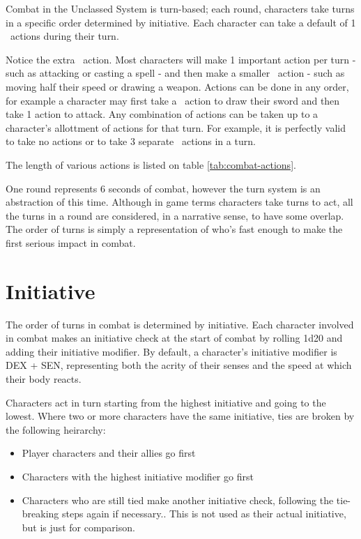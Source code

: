 \begin{multicols*}{2}
    Combat in the Unclassed System is turn-based; each round, characters take
    turns in a specific order determined by initiative. Each character can
    take a default of 1 \textonehalf\ actions during their turn.

    Notice the extra \textonehalf\ action. Most characters will make 1 important
    action per turn - such as attacking or casting a spell - and then make a
    smaller \textonehalf\ action - such as moving half their speed or drawing a
    weapon. Actions can be done in any order, for example a character may first
    take a \textonehalf\ action to draw their sword and then take 1 action to
    attack. Any combination of actions can be taken up to a character's
    allottment of actions for that turn. For example, it is perfectly valid
    to take no actions or to take 3 separate \textonehalf\ actions in a turn.

    The length of various actions is listed on table \ref{tab:combat-actions}.

    One round represents 6 seconds of combat, however the turn system is an
    abstraction of this time. Although in game terms characters take turns to
    act, all the turns in a round are considered, in a narrative sense, to have
    some overlap. The order of turns is simply a representation of who's fast
    enough to make the first serious impact in combat.

    \section{Initiative}
    The order of turns in combat is determined by initiative. Each character
    involved in combat makes an initiative check at the start of combat by
    rolling 1d20 and adding their initiative modifier. By default, a
    character's initiative modifier is DEX + SEN, representing both the acrity
    of their senses and the speed at which their body reacts.

    Characters act in turn starting from the highest initiative and going to
    the lowest. Where two or more characters have the same initiative, ties
    are broken by the following heirarchy:
    \begin{itemize}
        \item Player characters and their allies go first
        \item Characters with the highest initiative modifier go first
        \item Characters who are still tied make another initiative check,
            following the tie-breaking steps again if necessary..
            This is not used as their actual initiative, but is just for
            comparison.
    \end{itemize}


\end{multicols*}
